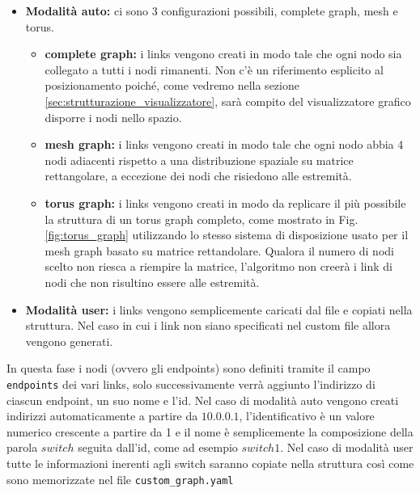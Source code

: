 \documentclass[binding=0.6cm]{sapthesis}
\begin{document}
\begin{itemize}
    \item \textbf{Modalità auto:} ci sono 3 configurazioni possibili, complete graph, mesh e torus.
    \begin{itemize}
        \item \textbf{complete graph:} i links vengono creati in modo tale che ogni nodo sia collegato a tutti i nodi rimanenti. Non c'è un riferimento esplicito al posizionamento poiché, come vedremo nella sezione \ref{sec:strutturazione_visualizzatore}, sarà compito del visualizzatore grafico disporre i nodi nello spazio.
        \item \textbf{mesh graph: } i links vengono creati in modo tale che ogni nodo abbia 4 nodi adiacenti rispetto a una distribuzione spaziale su matrice rettangolare, a eccezione dei nodi che risiedono alle estremità.
        \item \textbf{torus graph: } i links vengono creati in modo da replicare il più possibile la struttura di un torus graph completo, come mostrato in Fig. \ref{fig:torus_graph} utilizzando lo stesso sistema di disposizione usato per il mesh graph basato su matrice rettandolare.
        Qualora il numero di nodi scelto non riesca a riempire la matrice, l'algoritmo non creerà i link di nodi che non risultino essere alle estremità.
    \end{itemize} 
    \item \textbf{Modalità user:} i links vengono semplicemente caricati dal file e copiati nella struttura. Nel caso in cui i link non siano specificati nel custom file allora vengono generati.
\end{itemize}
In questa fase i nodi (ovvero gli endpoints) sono definiti tramite il campo \texttt{endpoints} dei vari links, solo successivamente verrà aggiunto l'indirizzo di ciascun endpoint, un suo nome e l'id.
Nel caso di modalità auto vengono creati indirizzi automaticamente a partire da \(10.0.0.1\), l'identificativo è un valore numerico crescente a partire da 1 e il nome è semplicemente la composizione
della parola \(switch\) seguita dall'id, come ad esempio \(switch1\).
Nel caso di modalità user tutte le informazioni inerenti agli switch saranno copiate nella struttura così come sono memorizzate nel file \texttt{custom\_graph.yaml}
\end{document}

